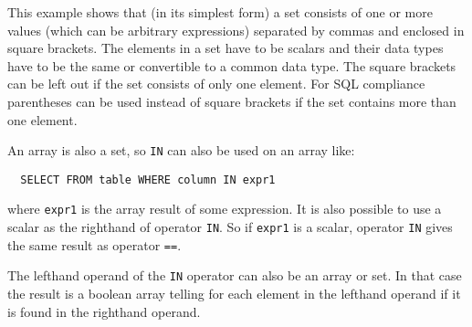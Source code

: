This example shows that (in its simplest form) a set
consists of one or more values (which
can be arbitrary expressions) separated by commas and enclosed in
square brackets. The elements in a set have to be scalars and their
data types have to be the same or convertible to a common data type.
 The square brackets can be left out if
the set consists of only one element. For SQL compliance
parentheses can be used instead of square brackets if the set contains
more than one element.

An array is also a set, so \texttt{IN} can also be used on an array
like:
\begin{verbatim}
  SELECT FROM table WHERE column IN expr1
\end{verbatim}
where \texttt{expr1} is the array result of some expression.
 It is also possible to use a scalar as the
righthand of operator \texttt{IN}.
So if \texttt{expr1} is a scalar, operator \texttt{IN}
gives the same result as operator \texttt{==}.

The lefthand operand of the \texttt{IN} operator can also be an array or
set. In that case the result is a boolean array telling for each
element in the lefthand operand if it is found in the righthand
operand.

